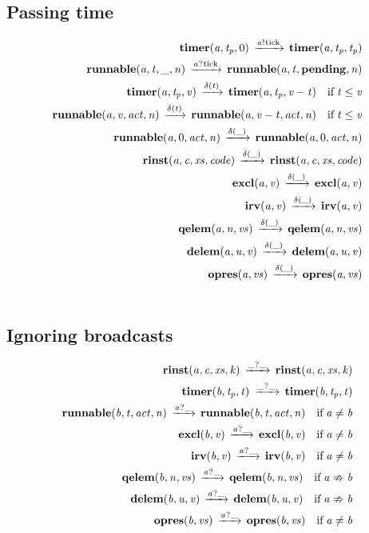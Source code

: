 \documentclass[twocolumn]{article}
\begin{document}
\subsection{Passing time}
\begin{eqnarray}      \PassingTime             \notag \end{eqnarray}

\subsection{Ignoring broadcasts}
\begin{eqnarray}      \IgnoreBroadcast         \notag \end{eqnarray}
\end{document}
